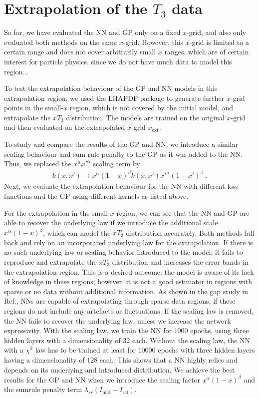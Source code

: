\documentclass[11pt,a4paper]{article}
\begin{document}
\section{Extrapolation of the $T_3$ data}
So far, we have evaluated the NN and GP only on a fixed $x$-grid, and also only evaluated both methods on the same $x$-grid. However, this $x$-grid is limited to a certain range and does not cover arbitrarily small $x$ ranges, which are of certain interest for particle physics, since we do not have much data to model this region... 

To test the extrapolation behaviour of the GP and NN models in this extrapolation region, we used the LHAPDF package to generate further $x$-grid points in the small-$x$ region, which is not covered by the initial model, and extrapolate the $xT_3$ distribution. The models are trained on the original $x$-grid and then evaluated on the extrapolated $x$-grid $x_\mathrm{ext}$.

To study and compare the results of the GP and NN, we introduce a similar scaling behaviour and sum-rule penalty to the GP as it was added to the NN. Thus, we replaced the $x^\alpha x'^\alpha$ scaling term by 
%
\begin{align}
    k(x, x') \rightarrow x^\alpha (1-x)^\beta k(x, x') x'^\alpha (1-x')^\beta \; .
\end{align}
%
Next, we evaluate the extrapolation behaviour for the NN with different loss functions and the GP using different kernels as listed above.

For the extrapolation in the small-$x$ region, we can see that the NN and GP are able to recover the underlying law if we introduce the additional scale $x^\alpha (1-x)^\beta$, which can model the $xT_3$ distribution accurately. 
Both methods fall back and rely on an incorporated underlying law for the extrapolation. If there is no such underlying law or scaling behavior introduced to the model, it fails to reproduce and extrapolate the $xT_3$ distribution and increases the error bands in the extrapolation region. This is a desired outcome: the model is aware of its lack of knowledge in these regions; however, it is not a good estimator in regions with sparse or no data without additional information. As shown in the gap study in Ref., NNs are capable of extrapolating through sparse data regions, if these regions do not include any artefacts or fluctuations.
If the scaling law is removed, the NN fails to recover the underlying law, unless we increase the network expressivity. With the scaling law, we train the NN for $1000$ epochs, using three hidden layers with a dimensionality of $32$ each. Without the scaling law, the NN with a $\chi^2$ law has to be trained at least for $10000$ epochs with three hidden layers having a dimensionality of $128$ each. 
This shows that a NN highly relies and depends on its underlying and introduced distribution. We achieve the best results for the GP and NN when we introduce the scaling factor $x^\alpha (1-x)^\beta$ and the sumrule penalty term $\lambda_{sr} (I_\mathrm{mid} - I_\mathrm{ref})$.
\end{document}
